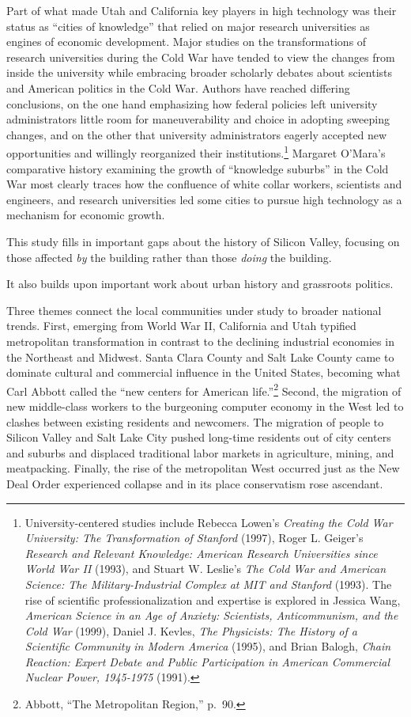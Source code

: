\documentclass[11pt,article,oneside]{memoir}
\begin{document}
Part of what made Utah and California key players in high technology was
their status as ``cities of knowledge'' that relied on major research
universities as engines of economic development. Major studies on the
transformations of research universities during the Cold War have tended
to view the changes from inside the university while embracing broader
scholarly debates about scientists and American politics in the Cold
War. Authors have reached differing conclusions, on the one hand
emphasizing how federal policies left university administrators little
room for maneuverability and choice in adopting sweeping changes, and on
the other that university administrators eagerly accepted new
opportunities and willingly reorganized their institutions.\footnote{University-centered
  studies include Rebecca Lowen's \emph{Creating the Cold War
  University: The Transformation of Stanford} (1997), Roger L. Geiger's
  \emph{Research and Relevant Knowledge: American Research Universities
  since World War II} (1993), and Stuart W. Leslie's \emph{The Cold War
  and American Science: The Military-Industrial Complex at MIT and
  Stanford} (1993). The rise of scientific professionalization and
  expertise is explored in Jessica Wang, \emph{American Science in an
  Age of Anxiety: Scientists, Anticommunism, and the Cold War} (1999),
  Daniel J. Kevles, \emph{The Physicists: The History of a Scientific
  Community in Modern America} (1995), and Brian Balogh, \emph{Chain
  Reaction: Expert Debate and Public Participation in American
  Commercial Nuclear Power, 1945-1975} (1991).} Margaret O'Mara's
comparative history examining the growth of ``knowledge suburbs'' in the
Cold War most clearly traces how the confluence of white collar workers,
scientists and engineers, and research universities led some cities to
pursue high technology as a mechanism for economic growth.

This study fills in important gaps about the history of Silicon Valley,
focusing on those affected \emph{by} the building rather than those
\emph{doing} the building.

It also builds upon important work about urban history and grassroots
politics.

Three themes connect the local communities under study to broader
national trends. First, emerging from World War II, California and Utah
typified metropolitan transformation in contrast to the declining
industrial economies in the Northeast and Midwest. Santa Clara County
and Salt Lake County came to dominate cultural and commercial influence
in the United States, becoming what Carl Abbott called the ``new centers
for American life.''\footnote{Abbott, ``The Metropolitan Region,''
  p.~90.} Second, the migration of new middle-class workers to the
burgeoning computer economy in the West led to clashes between existing
residents and newcomers. The migration of people to Silicon Valley and
Salt Lake City pushed long-time residents out of city centers and
suburbs and displaced traditional labor markets in agriculture, mining,
and meatpacking. Finally, the rise of the metropolitan West occurred
just as the New Deal Order experienced collapse and in its place
conservatism rose ascendant.
\end{document}
